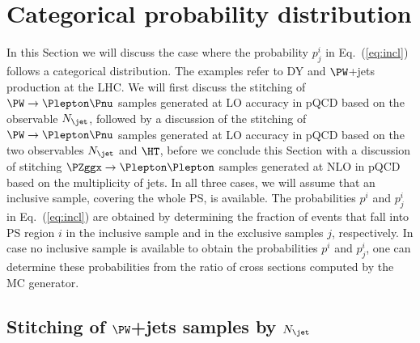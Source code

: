 \section{Categorical probability distribution}
\label{sec:examples_background_yield}

In this Section we will discuss the case where the probability $p_{j}^{i}$ in Eq.~(\ref{eq:incl}) follows a categorical distribution.
The examples refer to DY and $\PW$+jets production at the LHC.
We will first discuss the stitching of $\PW \to \Plepton\Pnu$ samples generated at LO accuracy in pQCD based on the observable $N_{\jet}$, 
followed by a discussion of the stitching of $\PW \to \Plepton\Pnu$ samples generated at LO accuracy in pQCD based on the two observables $N_{\jet}$ and $\HT$,
before we conclude this Section with a discussion of stitching $\PZggx \to \Plepton\Plepton$ samples generated at NLO in pQCD based on the multiplicity of jets.
In all three cases, we will assume that an inclusive sample, covering the whole PS, is available.
The probabilities $p^{i}$ and $p_{j}^{i}$ in Eq.~(\ref{eq:incl})
are obtained by determining the fraction of events that fall into PS region $i$ in the inclusive sample and in the exclusive samples $j$, respectively.
In case no inclusive sample is available to obtain the probabilities $p^{i}$ and $p_{j}^{i}$,
one can determine these probabilities from the ratio of cross sections computed by the MC generator.

\subsection{Stitching of $\PW$+jets samples by $N_{\jet}$}
\label{sec:WJets_vs_Njet}


